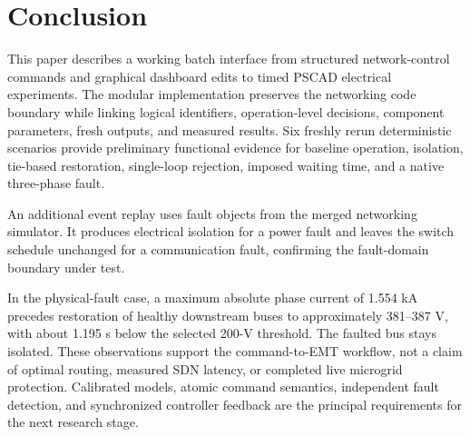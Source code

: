 \section{Conclusion}
This paper describes a working batch interface from structured network-control
commands and graphical dashboard edits to timed PSCAD electrical experiments.
The modular implementation preserves the networking code boundary while
linking logical identifiers, operation-level decisions, component parameters,
fresh outputs, and measured results. Six freshly rerun deterministic scenarios provide
preliminary functional evidence for baseline operation, isolation, tie-based
restoration, single-loop rejection, imposed waiting time, and a native
three-phase fault.

An additional event replay uses fault objects from the merged networking
simulator. It produces electrical isolation for a power fault and leaves the
switch schedule unchanged for a communication fault, confirming the
fault-domain boundary under test.

In the physical-fault case, a maximum absolute phase current of 1.554 kA
precedes restoration of healthy downstream buses to approximately
381--387 V, with about 1.195 s below the selected 200-V threshold. The faulted
bus stays isolated. These observations support the command-to-EMT workflow,
not a claim of optimal routing, measured SDN latency, or completed live
microgrid protection. Calibrated models, atomic command semantics, independent
fault detection, and synchronized controller feedback are the principal
requirements for the next research stage.
